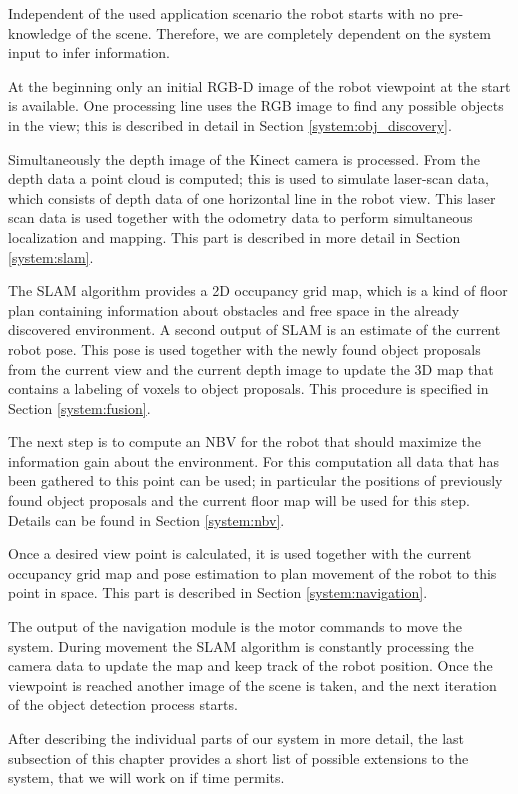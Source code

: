 \documentclass[a4paper,11pt,english]{article}
\begin{document}
Independent of the used application scenario the robot starts with no pre-knowledge of the scene.
Therefore, we are completely dependent on the system input to infer information.

At the beginning only an initial RGB-D image of the robot viewpoint at the start is available.
One processing line uses the RGB image to find any possible objects in the view; this is described in detail in Section \ref{system:obj_discovery}.

Simultaneously the depth image of the Kinect camera is processed.
From the depth data a point cloud is computed; this is used to simulate laser-scan data, which consists of depth data of one horizontal line in the robot view. 
This laser scan data is used together with the odometry data to perform simultaneous localization and mapping.
This part is described in more detail in Section \ref{system:slam}.

The SLAM algorithm provides a 2D occupancy grid map, which is a kind of floor plan containing information about obstacles and free space in the already discovered environment.
A second output of SLAM is an estimate of the current robot pose.
This pose is used together with the newly found object proposals from the current view and the current depth image to update the 3D map that contains a labeling of voxels to object proposals.
This procedure is specified in Section \ref{system:fusion}. 

The next step is to compute an NBV for the robot that should maximize the information gain about the environment.
For this computation all data that has been gathered to this point can be used; in particular the positions of previously found object proposals and the current floor map will be used for this step.
Details can be found in Section \ref{system:nbv}.

Once a desired view point is calculated, it is used together with the current occupancy grid map and pose estimation to plan movement of the robot to this point in space.
This part is described in Section \ref{system:navigation}.

The output of the navigation module is the motor commands to move the system.
During movement the SLAM algorithm is constantly processing the camera data to update the map and keep track of the robot position.
Once the viewpoint is reached another image of the scene is taken, and the next iteration of the object detection process starts.

After describing the individual parts of our system in more detail, the last subsection of this chapter provides a short list of possible extensions to the system, that we will work on if time permits.
\end{document}
